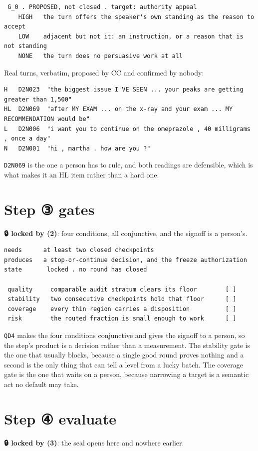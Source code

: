 \begin{verbatim}
 G_0 . PROPOSED, not closed . target: authority appeal
    HIGH   the turn offers the speaker's own standing as the reason to accept
    LOW    adjacent but not it: an instruction, or a reason that is not standing
    NONE   the turn does no persuasive work at all
\end{verbatim}
Real turns, verbatim, proposed by CC and confirmed by nobody:

\begin{verbatim}
H   D2N023  "the biggest issue I'VE SEEN ... your peaks are getting greater than 1,500"
HL  D2N069  "after MY EXAM ... on the x-ray and your exam ... MY RECOMMENDATION would be"
L   D2N006  "i want you to continue on the omeprazole , 40 milligrams , once a day"
N   D2N001  "hi , martha . how are you ?"
\end{verbatim}
\texttt{D2N069} is the one a person has to rule, and both readings are defensible, which is what makes it an HL item rather than a hard one.


\section{Step ③ gates}
\textbf{🔒 locked by (2)}: four conditions, all conjunctive, and the signoff is a person's.

\begin{verbatim}
needs      at least two closed checkpoints
produces   a stop-or-continue decision, and the freeze authorization
state       locked . no round has closed

 quality     comparable audit stratum clears its floor        [ ]
 stability   two consecutive checkpoints hold that floor      [ ]
 coverage    every thin region carries a disposition          [ ]
 risk        the routed fraction is small enough to work      [ ]
\end{verbatim}
\texttt{QD4} makes the four conditions conjunctive and gives the signoff to a person, so the step's product is a decision rather than a measurement. The stability gate is the one that usually blocks, because a single good round proves nothing and a second is the only thing that can tell a level from a lucky batch. The coverage gate is the one that waits on a person, because narrowing a target is a semantic act no default may take.


\section{Step ④ evaluate}
\textbf{🔒 locked by (3)}: the seal opens here and nowhere earlier.

